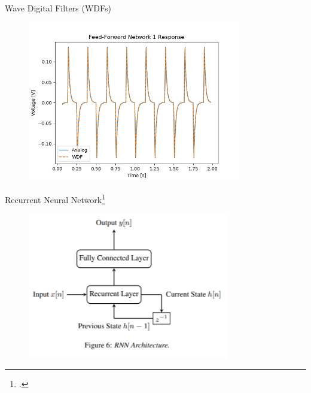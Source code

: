 \begin{frame}{Wave Digital Filters (WDFs)}
    \begin{figure}
        \centering
        \includegraphics[height=2.75in]{../Paper/Figures/WDFval.png}
    \end{figure}
\end{frame}

\begin{frame}
\end{frame}

\begin{frame}{Recurrent Neural Network\footcite{VArnn}}
    \begin{figure}
        \centering
        \includegraphics[height=2.5in]{Figures/RNNArch.png}
    \end{figure}
\end{frame}

